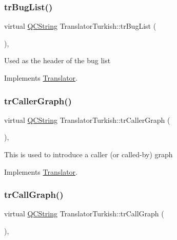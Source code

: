 \subsubsection{\texorpdfstring{trBugList()}{trBugList()}}
{\footnotesize\ttfamily virtual \mbox{\hyperlink{class_q_c_string}{Q\+C\+String}} Translator\+Turkish\+::tr\+Bug\+List (\begin{DoxyParamCaption}{ }\end{DoxyParamCaption})\hspace{0.3cm}{\ttfamily [inline]}, {\ttfamily [virtual]}}

Used as the header of the bug list 

Implements \mbox{\hyperlink{class_translator}{Translator}}.

\mbox{\label{class_translator_turkish_aeeed0e87c70175bbd8825415a5a54545}} 
\subsubsection{\texorpdfstring{trCallerGraph()}{trCallerGraph()}}
{\footnotesize\ttfamily virtual \mbox{\hyperlink{class_q_c_string}{Q\+C\+String}} Translator\+Turkish\+::tr\+Caller\+Graph (\begin{DoxyParamCaption}{ }\end{DoxyParamCaption})\hspace{0.3cm}{\ttfamily [inline]}, {\ttfamily [virtual]}}

This is used to introduce a caller (or called-\/by) graph 

Implements \mbox{\hyperlink{class_translator}{Translator}}.

\mbox{\label{class_translator_turkish_af524053a9e2e538570b429e922475620}} 
\subsubsection{\texorpdfstring{trCallGraph()}{trCallGraph()}}
{\footnotesize\ttfamily virtual \mbox{\hyperlink{class_q_c_string}{Q\+C\+String}} Translator\+Turkish\+::tr\+Call\+Graph (\begin{DoxyParamCaption}{ }\end{DoxyParamCaption})\hspace{0.3cm}{\ttfamily [inline]}, {\ttfamily [virtual]}}


